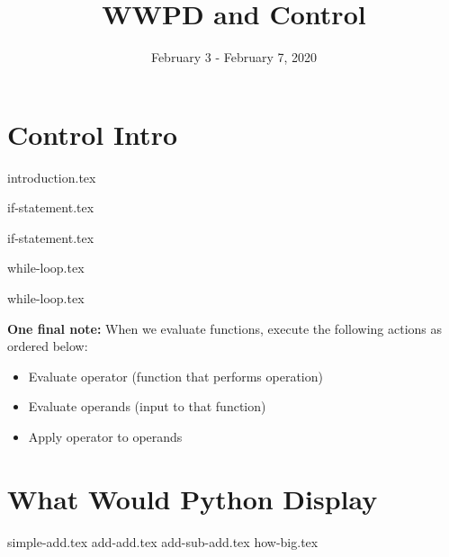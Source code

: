 \documentclass{exam}
\title{WWPD and Control}
\date{February 3 - February 7, 2020}
\begin{document}
\maketitle
\section{Control Intro}
{introduction.tex}


{if-statement.tex}

{if-statement.tex}

{while-loop.tex}

{while-loop.tex}

\vspace{5}                                                                                                                                                                                                                                                                                                                                                                                                                                                                                                                                                                                                                                                                                                                                                                                                                                                                                                                                                                              
\textbf{One final note: } When we evaluate functions, execute the following actions as ordered below:
\begin{itemize}
  \item Evaluate operator (function that performs operation)
  \item Evaluate operands (input to that function)
  \item Apply operator to operands
\end{itemize}


\section{What Would Python Display}
\begin{questions}
{simple-add.tex}
{add-add.tex}
{add-sub-add.tex}
{how-big.tex}

\end{questions}
\newpage
\end{document}
